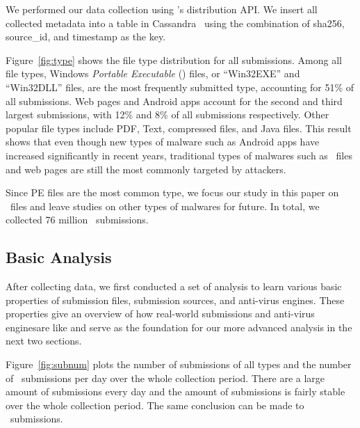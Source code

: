 We performed our data collection using \vt{}’s distribution API.
We insert all collected metadata into a table in Cassandra~\cite{cassandra} 
using the combination of sha256, source\_id, and timestamp as the key.



Figure~\ref{fig:type} shows the file type distribution for all submissions. 
Among all file types, Windows \textit{Portable Executable} ({\em \pe}) files, or ``Win32EXE'' and ``Win32DLL'' files, 
are the most frequently submitted type,
accounting for 51\% of all submissions.
Web pages and Android apps account for the second and third largest submissions, 
with 12\% and 8\% of all submissions respectively. 
Other popular file types include PDF, Text, compressed files, and Java files. 
This result shows that even though new types of malware such as Android apps have
increased significantly in recent years, 
traditional types of malwares such as \pe\ files and web pages are still the 
most commonly targeted by attackers.

Since PE files are the most common type,
we focus our study in this paper on \pe\ files 
and leave studies on other types of malwares for future. 
In total, we collected 76 million \pe\ submissions.

\subsection{Basic Analysis}
After collecting data, we first conducted a set of analysis 
to learn various basic properties of submission files, 
submission sources, and anti-virus engines.
These properties give an overview of how real-world submissions and anti-virus enginesare like
and serve as the foundation for our more advanced analysis in the next two sections. 



Figure~\ref{fig:subnum} plots the number of submissions of all types and the number of \pe\ submissions per day 
over the whole collection period.
There are a large amount of submissions every day
and the amount of submissions is fairly stable over the whole collection period.
The same conclusion can be made to \pe\ submissions.

